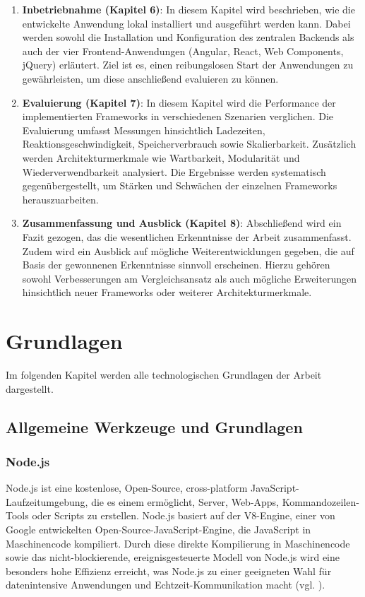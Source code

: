 \documentclass[oneside]{ausarbeitung}
\begin{document}
\begin{enumerate}
\item \textbf{Inbetriebnahme (Kapitel 6)}: In diesem Kapitel wird beschrieben, wie die entwickelte Anwendung lokal installiert und ausgeführt werden kann. Dabei werden sowohl die Installation und Konfiguration des zentralen Backends als auch der vier Frontend-Anwendungen (Angular, React, Web Components, jQuery) erläutert. Ziel ist es, einen reibungslosen Start der Anwendungen zu gewährleisten, um diese anschließend evaluieren zu können.

\item \textbf{Evaluierung (Kapitel 7)}: In diesem Kapitel wird die Performance der implementierten Frameworks in verschiedenen Szenarien verglichen. Die Evaluierung umfasst Messungen hinsichtlich Ladezeiten, Reaktionsgeschwindigkeit, Speicherverbrauch sowie Skalierbarkeit. Zusätzlich werden Architekturmerkmale wie Wartbarkeit, Modularität und Wiederverwendbarkeit analysiert. Die Ergebnisse werden systematisch gegenübergestellt, um Stärken und Schwächen der einzelnen Frameworks herauszuarbeiten.

\item \textbf{Zusammenfassung und Ausblick (Kapitel 8)}: Abschließend wird ein Fazit gezogen, das die wesentlichen Erkenntnisse der Arbeit zusammenfasst. Zudem wird ein Ausblick auf mögliche Weiterentwicklungen gegeben, die auf Basis der gewonnenen Erkenntnisse sinnvoll erscheinen. Hierzu gehören sowohl Verbesserungen am Vergleichsansatz als auch mögliche Erweiterungen hinsichtlich neuer Frameworks oder weiterer Architekturmerkmale.
\end{enumerate}  
\chapter{Grundlagen}
\label{chap:grundlagen}

Im folgenden Kapitel werden alle technologischen Grundlagen der Arbeit dargestellt.

\section{Allgemeine Werkzeuge und Grundlagen}
\subsection{Node.js}

Node.js ist eine kostenlose, Open-Source, cross-platform JavaScript-Laufzeitumgebung, die es einem ermöglicht, Server, Web-Apps, Kommandozeilen-Tools oder Scripts zu erstellen. Node.js basiert auf der V8-Engine, einer von Google entwickelten Open-Source-JavaScript-Engine, die JavaScript in Maschinencode kompiliert. Durch diese direkte Kompilierung in Maschinencode sowie das nicht-blockierende, ereignisgesteuerte Modell von Node.js wird eine besonders hohe Effizienz erreicht, was Node.js zu einer geeigneten Wahl für datenintensive Anwendungen und Echtzeit-Kommunikation macht (vgl. \parencite{nodejs}).
\end{document}
